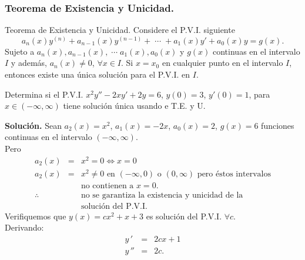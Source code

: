 \documentclass{beamer}
\begin{document}
\frame{\titlepage}

\begin{frame}[t]
	\frametitle{Teorema de Existencia y Unicidad.}
\begin{block}{Teorema de Existencia y Unicidad.}
	Considere el P.V.I. siguiente
	\[
		a_n(x) y^{(n)} + a_{n-1} (x) y^{(n-1)} + \;\cdots\; + a_1(x) y' +a_0(x) y = g(x).
	\]
	Sujeto a \(a_n(x) , a_{n-1} (x) , \;\cdots\; a_1(x) ,a_0(x)\) y \(g(x)\) continuas en el intervalo \(I\) y además, \(a_n(x) \ne 0\), \(\forall x \in I\). Si \(x=x_0\) en cualquier punto en el intervalo \(I\), entonces existe una única solución para el P.V.I. en \(I\).
\end{block}
	\begin{example}
		Determina si el P.V.I. \(x^2y'' -2xy' +2y=6\), \(y(0) =3\), \(y' (0) =1\), para \(x \in (- \infty , \infty)\) tiene solución única usando e T.E. y U.
	\end{example}
\end{frame}
\begin{frame}[t]
	\begin{exampleblock}{}
		\textbf{Solución.} Sean \(a_2(x) = x^2\), \(a_1(x) = -2x\), \(a_0(x) = 2\), \(g(x) = 6\) funciones continuas en el intervalo \((- \infty , \infty)\). \\[2mm]
		Pero
		\[
			\begin{array}{rcl}
				a_2(x) & = & x^2 = 0 \iff x = 0 \\[2mm]
				a_2(x) & = & x^2 \ne 0 \mbox{ en } (- \infty ,0) \mbox{ o } (0, \infty) \mbox{ pero éstos intervalos} \\[2mm]
				&& \mbox{no contienen a } x=0. \\[2mm]
				\therefore && \mbox{no se garantiza la existencia y unicidad de la} \\[2mm]
				&& \mbox{solución del P.V.I.}
			\end{array}
		\]
		Verifiquemos que \(y(x) = cx^2+x+3\) es solución del P.V.I. \(\forall c\). \\[2mm]
		Derivando:
		\[
			\begin{array}{rcl}
				y\,' & = & 2cx+1 \\[2mm]
				y\,'' & = & 2c.
			\end{array}
		\]
	\end{exampleblock}
\end{frame}
\end{document}
